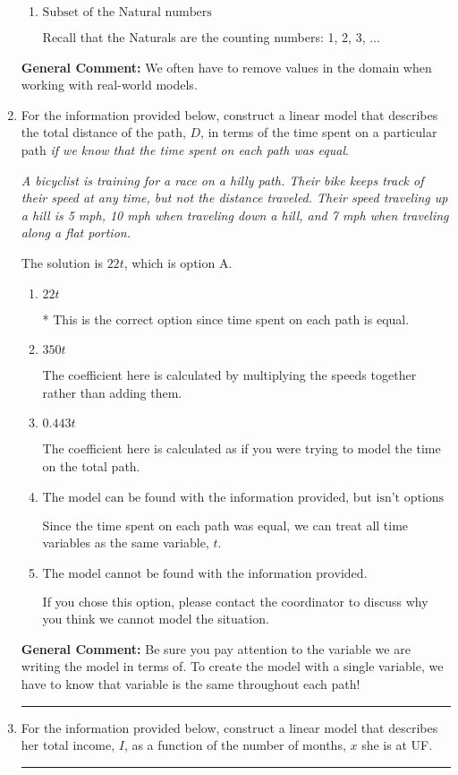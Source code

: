 \documentclass{extbook}[14pt]
\newcommand{\litem}[1]{\item #1

\rule{\textwidth}{0.4pt}}
\begin{document}
\begin{enumerate}
{\begin{enumerate}[label=\Alph*.]
This means we have a domain of the Real numbers but need to throw out values based on the context.
\item \( \text{Subset of the Natural numbers} \)

Recall that the Naturals are the counting numbers: 1, 2, 3, ...
\end{enumerate}

\textbf{General Comment:} We often have to remove values in the domain when working with real-world models.
}
\litem{
For the information provided below, construct a linear model that describes the total distance of the path, $D$, in terms of the time spent on a particular path \textit{if we know that the time spent on each path was equal}.

\begin{center}
    \textit{ A bicyclist is training for a race on a hilly path. Their bike keeps track of their speed at any time, but not the distance traveled. Their speed traveling up a hill is 5 mph, 10 mph when traveling down a hill, and 7 mph when traveling along a flat portion. }
\end{center}
The solution is \( 22 t \), which is option A.\begin{enumerate}[label=\Alph*.]
\item \( 22 t \)

* This is the correct option since time spent on each path is equal.
\item \( 350 t \)

The coefficient here is calculated by multiplying the speeds together rather than adding them.
\item \( 0.443 t \)

The coefficient here is calculated as if you were trying to model the time on the total path.
\item \( \text{The model can be found with the information provided, but isn't options 1-3.} \)

Since the time spent on each path was equal, we can treat all time variables as the same variable, $t$.
\item \( \text{The model cannot be found with the information provided.} \)

If you chose this option, please contact the coordinator to discuss why you think we cannot model the situation.
\end{enumerate}

\textbf{General Comment:} Be sure you pay attention to the variable we are writing the model in terms of. To create the model with a single variable, we have to know that variable is the same throughout each path!
}
\litem{
For the information provided below, construct a linear model that describes her total income, $I$, as a function of the number of months, $x$ she is at UF.

}
\end{enumerate}
\end{document}
